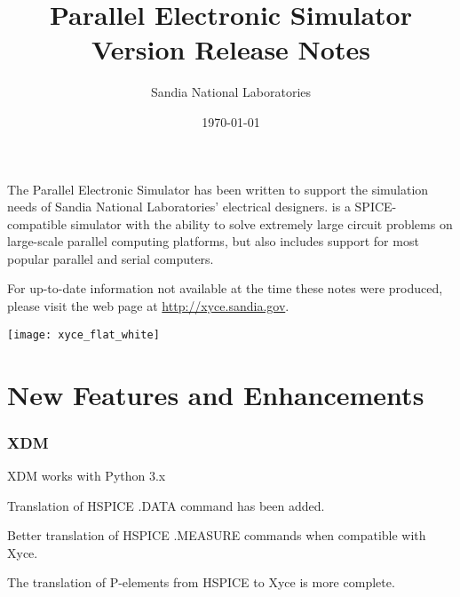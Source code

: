 \documentclass[letterpaper]{scrartcl}
\title{\XyceTitle{} Parallel Electronic Simulator\\
Version \XyceVersionVar{} Release Notes}
\author{ Sandia National Laboratories}
\date{\today}
\begin{document}
\maketitle

The \XyceTM{} Parallel Electronic Simulator has been written to support the
simulation needs of Sandia National Laboratories' electrical designers.
\XyceTM{} is a SPICE-compatible simulator with the ability to solve extremely
large circuit problems on large-scale parallel computing platforms, but also
includes support for most popular parallel and serial computers.

For up-to-date information not available at the time these notes were produced,
please visit the \XyceTM{} web page at
{\color{XyceDeepRed}\url{http://xyce.sandia.gov}}.


\tableofcontents
\vspace*{\fill}
\parbox{\textwidth}
{
  \hfill
  \texttt{[image: xyce\_flat\_white]}
}


\newpage
\section{New Features and Enhancements}

\subsubsection*{XDM}
\begin{XyceItemize}
  \item XDM works with Python 3.x
  \item Translation of HSPICE .DATA command has been added.
  \item Better translation of HSPICE .MEASURE commands when compatible with Xyce.
  \item The translation of P-elements from HSPICE to Xyce is more complete.
\end{XyceItemize}
\end{document}
